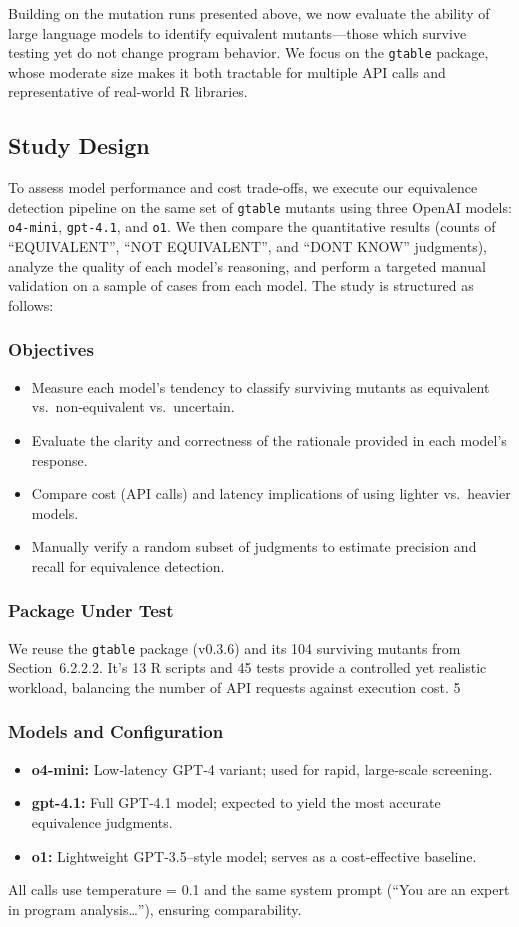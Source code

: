 Building on the mutation runs presented above, we now evaluate the ability of large language models to identify equivalent mutants—those which survive testing yet do not change program behavior.  We focus on the \texttt{gtable} package, whose moderate size makes it both tractable for multiple API calls and representative of real‐world R libraries.

\subsection{Study Design}

To assess model performance and cost trade‐offs, we execute our equivalence detection pipeline on the same set of \texttt{gtable} mutants using three OpenAI models: \texttt{o4-mini}, \texttt{gpt-4.1}, and \texttt{o1}.  We then compare the quantitative results (counts of “EQUIVALENT”, “NOT EQUIVALENT”, and “DONT KNOW” judgments), analyze the quality of each model’s reasoning, and perform a targeted manual validation on a sample of cases from each model.  The study is structured as follows:

\subsubsection{Objectives}
\begin{itemize}
  \item Measure each model’s tendency to classify surviving mutants as equivalent vs.\ non‐equivalent vs.\ uncertain.
  \item Evaluate the clarity and correctness of the rationale provided in each model’s response.
  \item Compare cost (API calls) and latency implications of using lighter vs.\ heavier models.
  \item Manually verify a random subset of judgments to estimate precision and recall for equivalence detection.
\end{itemize}

\subsubsection{Package Under Test}
We reuse the \texttt{gtable} package (v0.3.6) and its 104 surviving mutants from Section~6.2.2.2.  It's 13 R scripts and 45 tests provide a controlled yet realistic workload, balancing the number of API requests against execution cost.
5
\subsubsection{Models and Configuration}
\begin{itemize}
  \item \textbf{o4-mini:} Low‐latency GPT‐4 variant; used for rapid, large‐scale screening.
  \item \textbf{gpt-4.1:} Full GPT‐4.1 model; expected to yield the most accurate equivalence judgments.
  \item \textbf{o1:} Lightweight GPT‐3.5–style model; serves as a cost‐effective baseline.
\end{itemize}
All calls use temperature = 0.1 and the same system prompt (“You are an expert in program analysis…”), ensuring comparability.

